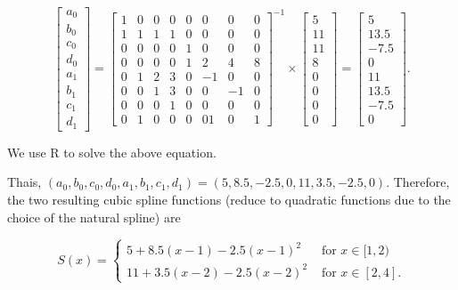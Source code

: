 \documentclass[
]{book}
\begin{document}
\[
\left[ \begin{array}{c} a_0 \\b_0\\c_0\\d_0 \\ a_1\\b_1\\c_1\\d_1 \end{array} \right] =  \begin{bmatrix} 
 1 & 0 & 0 & 0 & 0 & 0 & 0 & 0 \\ 
 1 & 1 & 1 & 1 & 0 & 0 & 0 & 0 \\ 
 0 & 0 & 0 & 0 & 1 & 0 & 0 & 0 \\
 0 & 0 & 0 & 0 & 1 & 2 & 4 & 8 \\
 0 & 1 & 2 & 3 & 0 & -1 & 0 & 0 \\
 0 & 0 & 1 & 3 & 0 & 0 & -1 & 0 \\
 0 & 0 & 0 & 1 & 0 & 0 & 0 & 0 \\
 0 & 1 & 0 & 0 & 0 & 01 & 0 & 1  
 \end{bmatrix}^{-1}\times \left[ \begin{array}{c} 5 \\ 11\\11\\8\\0\\0\\0\\0 \end{array} \right] 
 =\left[ \begin{array}{c} 5 \\ 13.5\\-7.5\\0\\11\\13.5\\-7.5\\0 \end{array} \right].
\]

We use R to solve the above equation.

Thais, \((a_0,b_0,c_0,d_0,a_1,b_1,c_1,d_1) = (5, 8.5, -2.5, 0, 11, 3.5, -2.5, 0)\). Therefore, the two resulting cubic spline functions (reduce to quadratic functions due to the choice of the natural spline) are

\[
S(x)=
    \begin{cases}
        5 + 8.5(x-1) -2.5(x-1)^2  & \text{ for } x\in[1, 2)\\
        11 + 3.5(x-2) -2.5(x-2)^2  & \text{ for } x\in[2, 4].
    \end{cases}
\]
\end{document}
